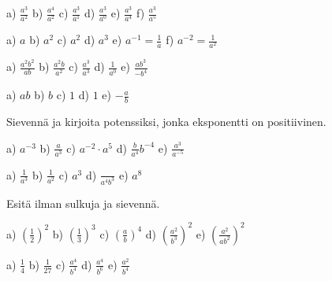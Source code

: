     \begin{tehtava}
        a) $\frac{a^3}{a^2}$ \qquad
        b) $\frac{a^4}{a^2}$ \qquad
        c) $\frac{a^3}{a^1}$ \qquad
        d) $\frac{a^3}{a^0}$ \qquad
        e) $\frac{a^3}{a^4}$ \qquad
        f) $\frac{a^3}{a^5}$
        
        \begin{vastaus}
            a) $a$ \qquad
            b) $a^2$ \qquad
            c) $a^2$ \qquad
            d) $a^3$ \qquad
            e) $a^{-1} = \frac{1}{a}$ \qquad
            f) $a^{-2} = \frac{1}{a^2}$
        \end{vastaus}
    \end{tehtava}
    
    \begin{tehtava}
        a) $\frac{a^2b^2}{ab}$ \qquad
        b) $\frac{a^2b}{a^2}$ \qquad
        c) $\frac{a^3}{a^3}$ \qquad
        d) $\frac{1}{a^0}$ \qquad
        e) $\frac{ab^3}{-b^4}$
        
        \begin{vastaus}
            a) $ab$ \qquad
            b) $b$ \qquad
            c) $1$ \qquad
            d) $1$ \qquad
            e) $-\frac{a}{b}$
        \end{vastaus}
    \end{tehtava}
    
    Sievennä ja kirjoita potenssiksi, jonka eksponentti on positiivinen.
    
    \begin{tehtava}
        a) $a^{-3}$ \qquad
        b) $\frac{a}{a^3}$ \qquad
        c) $a^{-2}\cdot a^5$ \qquad
        d) $\frac{b}{a^4}b^{-4}$ \qquad
        e) $\frac{a^3}{a^{-5}}$
        
        \begin{vastaus}
            a) $\frac{1}{a^3}$ \qquad
            b) $\frac{1}{a^2}$ \qquad
            c) $a^3$ \qquad
            d) $\frac{}{a^4b^3}$ \qquad
            e) $a^8$
        \end{vastaus}
    \end{tehtava}
    
    Esitä ilman sulkuja ja sievennä.
    
    \begin{tehtava}
        a) $(\frac{1}{2})^2$ \qquad
        b) $(\frac{1}{3})^3$ \qquad
        c) $(\frac{a}{b})^4$ \qquad
        d) $(\frac{a^2}{b^3})^2$ \qquad
        e) $\left(\frac{a^2}{ab^2}\right)^2$
        
        \begin{vastaus}
            a) $\frac{1}{4}$ \qquad
            b) $\frac{1}{27}$ \qquad
            c) $\frac{a^4}{b^4}$ \qquad
            d) $\frac{a^4}{b^6}$ \qquad
            e) $\frac{a^2}{b^4}$
        \end{vastaus}
    \end{tehtava}
    
